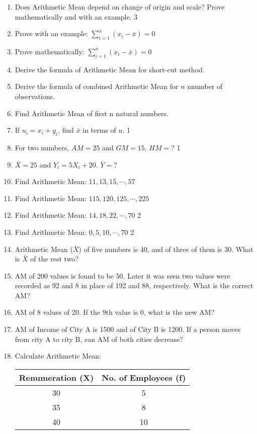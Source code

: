 \documentclass[a4paper,oneside]{book}
\begin{document}
\begin{enumerate}
    \item Does Arithmetic Mean depend on change of origin and 
    scale? Prove mathematically and with an example. \hfill 3
    \item Prove with an example: $\displaystyle \sum_{i=1}^n (x_i-\bar x) = 0$
    \item Prove mathematically: $\displaystyle \sum_{i=1}^n (x_i-\bar x) = 0$
    \item Derive the formula of Arithmetic Mean for short-cut method.
    \item Derive the formula of combined Arithmetic Mean for $n$ nnumber of observations.
    \item Find Arithmetic Mean of first n natural numbers.
    \item If $u_i = x_i + y_i$, find $\bar x$ in terms of $u$. \hfill 1
    \item For two numbers, $AM=25$ and $GM=15$. $HM=?$ \hfill 1
    \item $\bar X = 25$ and $Y_i = 5X_i + 20$. $\bar Y = ?$
    \item Find Arithmetic Mean: $11,13,15, \cdots, 57$
    \item Find Arithmetic Mean: $115,120,125, \cdots, 225$
    \item Find Arithmetic Mean: $14,18,22, \cdots, 70$ \hfill 2
    \item Find Arithmetic Mean: $0, 5, 10, \cdots, 70$ \hfill 2
    \item Arithmetic Mean ($\bar X$) of five numbers is 40, and of three of them is 30. What is $\bar X$ of the rest two?
    \item AM of 200 values is found to be 50. Later it was seen two values were recorded as 92 and 8 in place of 192 and 88, respectively. What is the correct AM?
    \item AM of 8 values of 20. If the 9th value is 0, what is the new AM?
    \item AM of Income of City A is 1500 and of City B is 1200. If a person moves from city A to city B, can AM of both cities decrease?
    \item Calculate Arithmetic Mean:
    
    \begin{table}[h]
    \centering
\begin{tabular}{c|c}
\textbf{Renumeration (X)} & \textbf{No. of Employees (f)} \\ \hline
30               & 5                    \\ \hline
35               & 8                    \\ \hline
40               & 10                  
\end{tabular}
\end{table}
    

\end{enumerate}
\end{document}
